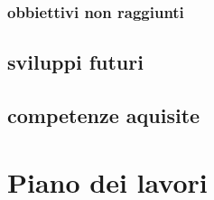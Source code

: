 \documentclass[twoside]{supsistudent}
\begin{document}
\subsection{obbiettivi non raggiunti}
\section{sviluppi futuri}%
\section{competenze aquisite}%

\chapter{Piano dei lavori}%

















\end{document}
